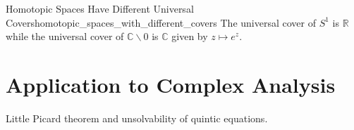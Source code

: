 \documentclass{article}
\begin{document}
\begin{example}{Homotopic Spaces Have Different Universal Covers}{homotopic_spaces_with_different_covers}
    The universal cover of $S^1$ is $\mathbb{R}$ while the universal cover of $\mathbb{C}\backslash\qty{0}$ is $\mathbb{C}$ given by $z\mapsto e^z$.
\end{example}

\section{Application to Complex Analysis}

Little Picard theorem and unsolvability of quintic equations.
\end{document}
